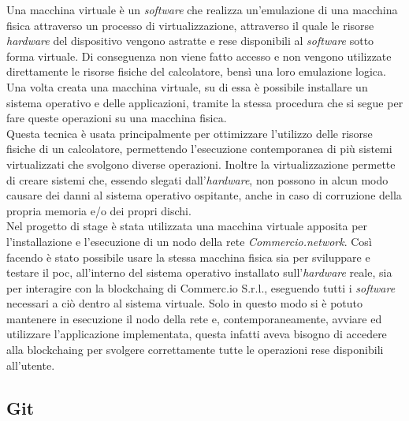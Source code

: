 Una macchina virtuale è un \textit{software} che realizza un'emulazione di una macchina fisica attraverso un processo di virtualizzazione, attraverso il quale le risorse \textit{hardware} del dispositivo vengono astratte e rese disponibili al \textit{software} sotto forma virtuale. Di conseguenza non viene fatto accesso e non vengono utilizzate direttamente le risorse fisiche del calcolatore, bensì una loro emulazione logica. Una volta creata una macchina virtuale, su di essa è possibile installare un sistema operativo e delle applicazioni, tramite la stessa procedura che si segue per fare queste operazioni su una macchina fisica.\\
Questa tecnica è usata principalmente per ottimizzare l'utilizzo delle risorse fisiche di un calcolatore, permettendo l'esecuzione contemporanea di più sistemi virtualizzati che svolgono diverse operazioni. Inoltre la virtualizzazione permette di creare sistemi che, essendo slegati dall'\textit{hardware}, non possono in alcun modo causare dei danni al sistema operativo ospitante, anche in caso di corruzione della propria memoria e/o dei propri dischi.\\
Nel progetto di stage è stata utilizzata una macchina virtuale apposita per l'installazione e l'esecuzione di un nodo della rete \textit{Commercio.network}. Così facendo è stato possibile usare la stessa macchina fisica sia per sviluppare e testare il \gls{poc}, all'interno del sistema operativo installato sull'\textit{hardware} reale, sia per interagire con la \gls{blockchaing} di Commerc.io S.r.l., eseguendo tutti i \textit{software} necessari a ciò dentro al sistema virtuale. Solo in questo modo si è potuto mantenere in esecuzione il nodo della rete e, contemporaneamente, avviare ed utilizzare l'applicazione implementata, questa infatti aveva bisogno di accedere alla \gls{blockchaing} per svolgere correttamente tutte le operazioni rese disponibili all'utente.

\subsection{Git}


